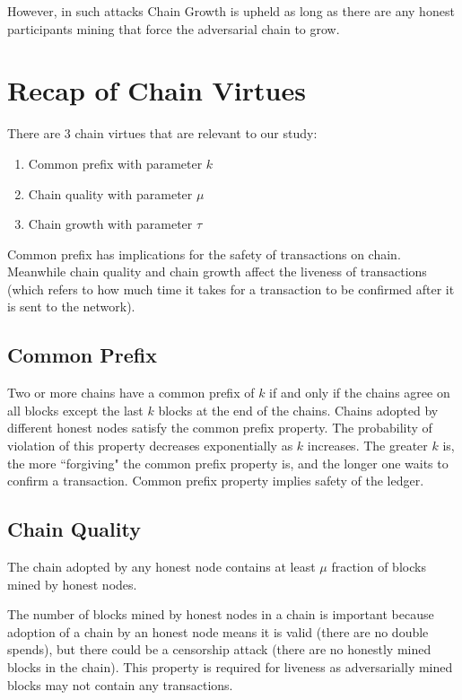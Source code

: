 However, in such attacks Chain Growth is upheld as long as there are any honest participants mining that force the adversarial chain to grow.

\section{Recap of Chain Virtues}
There are 3 chain virtues that are relevant to our study:

\begin{enumerate}
    \item Common prefix with parameter $k$
    \item Chain quality with parameter $\mu$
    \item Chain growth with parameter $\tau$
\end{enumerate}


Common prefix has implications for the safety of transactions on chain. Meanwhile chain quality and chain growth affect the liveness of transactions (which refers to how much time it takes for a transaction to be confirmed after it is sent to the network).

\subsection{Common Prefix}

Two or more chains have a common prefix of $k$ if and only if the chains agree on all blocks except the last $k$ blocks at the end of the chains.
Chains adopted by different honest nodes satisfy the common prefix property.
The probability of violation of this property decreases exponentially as $k$ increases. The greater $k$ is, the more ``forgiving" the common prefix property is, and the longer one waits to confirm a transaction.
Common prefix property implies safety of the ledger.

\subsection{Chain Quality}
The chain adopted by any honest node contains at least $\mu$ fraction of blocks mined by honest nodes.

The number of blocks mined by honest nodes in a chain is important because adoption of a chain by an honest node means it is valid (there are no double spends), but there could be a censorship attack (there are no honestly mined blocks in the chain).
This property is required for liveness as adversarially mined blocks may not contain any transactions.


